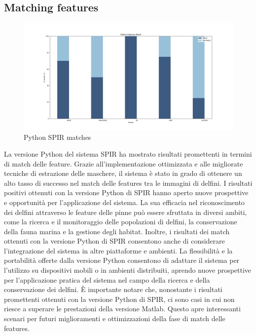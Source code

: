 \documentclass[a4paper,12pt]{report}
\begin{document}
    \subsection{Matching features}
    \begin{figure}[H]
      \centering
      \includegraphics[width=\textwidth]{assets/images/results/result_match.png}   
      \caption{Python SPIR matches}
    \end{figure}

    La versione Python del sistema SPIR ha mostrato risultati promettenti in termini di match delle feature. Grazie all'implementazione ottimizzata e alle migliorate tecniche di estrazione delle maschere, il sistema è stato in grado di ottenere un alto tasso di successo nel match delle features tra le immagini di delfini.
    I risultati positivi ottenuti con la versione Python di SPIR hanno aperto nuove prospettive e opportunità per l'applicazione del sistema. La sua efficacia nel riconoscimento dei delfini attraverso le feature delle pinne può essere sfruttata in diversi ambiti, come la ricerca e il monitoraggio delle popolazioni di delfini, la conservazione della fauna marina e la gestione degli habitat.
    Inoltre, i risultati dei match ottenuti con la versione Python di SPIR consentono anche di considerare l'integrazione del sistema in altre piattaforme e ambienti. La flessibilità e la portabilità offerte dalla versione Python consentono di adattare il sistema per l'utilizzo su dispositivi mobili o in ambienti distribuiti, aprendo nuove prospettive per l'applicazione pratica del sistema nel campo della ricerca e della conservazione dei delfini.
    È importante notare che, nonostante i risultati promettenti ottenuti con la versione Python di SPIR, ci sono casi in cui non riesce a superare le prestazioni della versione Matlab. Questo apre interessanti scenari per futuri miglioramenti e ottimizzazioni della fase di match delle features.
\end{document}
